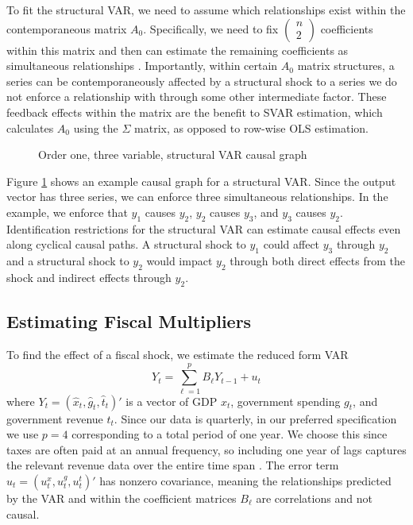 To fit the structural VAR, we need to assume which relationships exist within the contemporaneous matrix $A_0$. Specifically, we need to fix $\begin{pmatrix} n \\ 2 \end{pmatrix}$ coefficients within this matrix and then can estimate the remaining coefficients as simultaneous relationships \parencite{neusser2016time}. Importantly, within certain $A_0$ matrix structures, a series can be contemporaneously affected by a structural shock to a series we do not enforce a relationship with through some other intermediate factor. These feedback effects within the matrix are the benefit to SVAR estimation, which calculates $A_0$ using the $\Sigma$ matrix, as opposed to row-wise OLS estimation.

\begin{figure}[t!]
    \centering
    \caption{Order one, three variable, structural VAR causal graph}
    
    \label{fig:svar-graph}
\end{figure}

Figure \ref{fig:svar-graph} shows an example causal graph for a structural VAR. Since the output vector has three series, we can enforce three simultaneous relationships. In the example, we enforce that $y_1$ causes $y_2$, $y_2$ causes $y_3$, and $y_3$ causes $y_2$. Identification restrictions for the structural VAR can estimate causal effects even along cyclical causal paths. A structural shock to $y_1$ could affect $y_3$ through $y_2$ and a structural shock to $y_2$ would impact $y_2$ through both direct effects from the shock and indirect effects through $y_2$.


\subsection{Estimating Fiscal Multipliers}

To find the effect of a fiscal shock, we estimate the reduced form VAR
\[
    Y_t = \sum_{\ell = 1}^p B_\ell Y_{t - 1} + u_t
\]
where $Y_t = (\hat{x}_t, \hat{g}_t, \hat{t}_t)'$ is a vector of GDP $x_t$, government spending $g_t$, and government revenue $t_t$. Since our data is quarterly, in our preferred specification we use $p = 4$ corresponding to a total period of one year. We choose this since taxes are often paid at an annual frequency, so including one year of lags captures the relevant revenue data over the entire time span \parencite{blanchard2002empirical}. The error term $u_t = (u_t^x, u_t^g, u_t^t)'$ has nonzero covariance, meaning the relationships predicted by the VAR and within the coefficient matrices $B_\ell$ are correlations and not causal.

